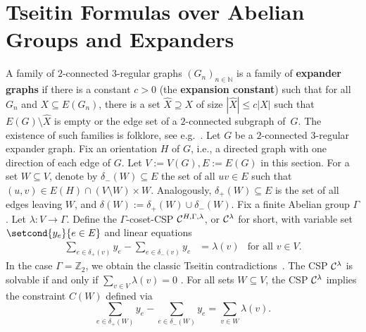 \documentclass[a4paper,english, thm-restate]{lipics-v2021}
\newcommand{\ZZ}{\mathbb{Z}}
\newcommand{\defining}[1]{\textbf{#1}}
\newcommand{\bbN}{\mathbb{N}}
\begin{document}
	\section{Tseitin Formulas over Abelian Groups and Expanders}
	\label{sec:tseitin}
	A family of $2$-connected $3$-regular graphs $(G_n)_{n \in \bbN}$ is a family of \defining{expander graphs} if there is a constant $c > 0$ (the \defining{expansion constant}) such that for all $G_n$ and $X \subseteq E(G_n)$, there is a set $\hat{X} \supseteq X$ of size $|\hat{X}| \leq c|X|$ such that $E(G) \setminus \hat{X}$ is empty or the edge set of a $2$-connected subgraph of~$G$.
	The existence of such families is folklore, see e.g.\ \cite{berkholzGrohe2016fullVersion}.
	Let $G$ be a $2$-connected $3$-regular expander graph.
	Fix an orientation $H$ of $G$, i.e., a directed graph
	with one direction of each edge of $G$. Let $V:= V(G), E := E(G)$ in this section.
	For a set $W \subseteq V$, denote by $\delta_-(W) \subseteq E$
	the set of all $uv\in E$
	such that $(u,v) \in E(H) \cap (V \setminus W) \times W$.
	Analogously, $\delta_+(W)\subseteq E$ is the set of all edges leaving $W$, and $\delta(W) := \delta_+(W) \cup \delta_{-}(W)$.
	Fix a finite Abelian group $\Gamma$. Let $\lambda \colon V \to \Gamma$.
	Define the $\Gamma$-coset-CSP $\grpCSP{H}{\Gamma}{\lambda}$, or $\grpCSPf{H}{\Gamma}{\lambda}$ for short, with variable set $\setcond{y_e }{ e \in E}$ and linear equations
	\begin{align*}
		\sum_{e\in \delta_+(v)} y_e - 	\sum_{e\in \delta_-(v)} y_e &= \lambda(v) &\text{for all } v\in V.
	\end{align*}
	In the case $\Gamma = \ZZ_2$, we obtain the classic Tseitin contradictions~\cite{Tseitin1983}.
The CSP $\grpCSPf{H}{\Gamma}{\lambda}$ is solvable if and only if $\sum_{v \in V} \lambda(v) = 0$ \cite{BerkholzGrohe2017}.
For all sets $W \subseteq V$,
	the CSP $\grpCSPf{H}{\Gamma}{\lambda}$ implies the constraint $C(W)$ defined via
	\[ \sum_{e\in \delta_+(W)} y_e - 	\sum_{e\in \delta_-(W)} y_e = \sum_{v \in W}\lambda(v).\]
	
\end{document}
